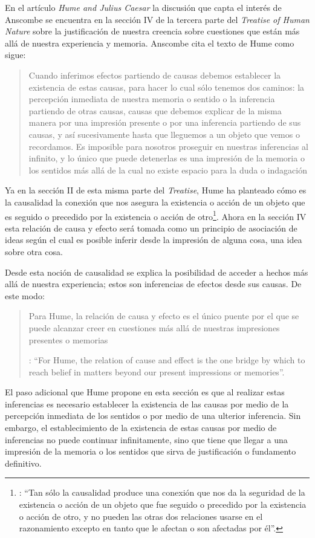 En el artículo \emph{Hume and Julius Caesar} la discusión que capta el interés de Anscombe se encuentra en la sección IV de la tercera parte del \emph{Treatise of Human Nature} sobre la justificación de nuestra creencia sobre cuestiones que están más allá de nuestra experiencia y memoria. Anscombe cita el texto de Hume como sigue: \blockquote[{\Cite[75]{hume1740treatisees}}]{Cuando inferimos efectos partiendo de causas debemos establecer la existencia de estas causas, para hacer lo cual sólo tenemos dos caminos: la percepción inmediata de nuestra memoria o sentido o la inferencia partiendo de otras causas, causas que debemos explicar de la misma manera por una impresión presente o por una inferencia partiendo de sus causas, y así sucesivamente hasta que lleguemos a un objeto que vemos o recordamos. Es imposible para nosotros proseguir en nuestras inferencias al infinito, y lo único que puede detenerlas es una impresión de la memoria o los sentidos más allá de la cual no existe espacio para la duda o indagación}.

Ya en la sección II de esta misma parte del \emph{Treatise}, Hume ha planteado cómo es la causalidad la conexión que nos asegura la existencia o acción de un objeto que es seguido o precedido por la existencia o acción de otro\footnote{\cite[Cf.][53]{hume1740treatisees}: \enquote{Tan sólo la causalidad produce una conexión que nos da la seguridad de la existencia o acción de un objeto que fue seguido o precedido por la existencia o acción de otro, y no pueden las otras dos relaciones usarse en el razonamiento excepto en tanto que le afectan o son afectadas por él}.}. Ahora en la sección IV esta relación de causa y efecto será tomada como un principio de asociación de ideas según el cual es posible inferir desde la impresión de alguna cosa, una idea sobre otra cosa.

Desde esta noción de causalidad se explica la posibilidad de acceder a hechos más allá de nuestra experiencia; estos son inferencias de efectos desde sus causas. De este modo: \blockquote[{\Cite[87]{anscombe1981parmenides:humeandjulius}}: \enquote{For Hume, the relation of cause and effect is the one bridge by which to reach belief in matters beyond our present impressions or memories}.]{Para Hume, la relación de causa y efecto es el único puente por el que se puede alcanzar creer en cuestiones más allá de nuestras impresiones presentes o memorias}.

El paso adicional que Hume propone en esta sección es que al realizar estas inferencias es necesario establecer la existencia de las causas por medio de la percepción inmediata de los sentidos o por medio de una ulterior inferencia. Sin embargo, el establecimiento de la existencia de estas causas por medio de inferencias no puede continuar infinitamente, sino que tiene que llegar a una impresión de la memoria o los sentidos que sirva de justificación o fundamento definitivo.

